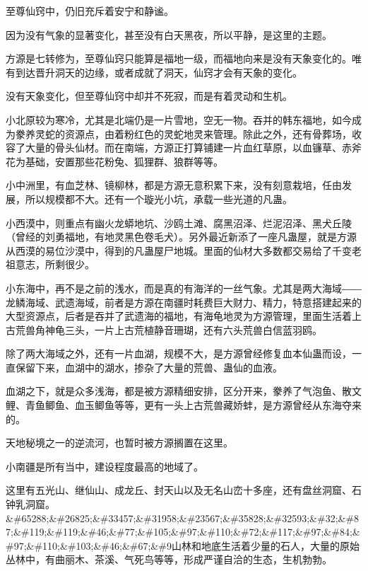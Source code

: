 
\begin{this_body}

至尊仙窍中，仍旧充斥着安宁和静谧。

因为没有气象的显著变化，甚至没有白天黑夜，所以平静，是这里的主题。

方源是七转修为，至尊仙窍只能算是福地一级，而福地向来是没有天象变化的。唯有到达晋升洞天的边缘，或者成就了洞天，仙窍才会有天象的变化。

没有天象变化，但至尊仙窍中却并不死寂，而是有着灵动和生机。

小北原较为寒冷，尤其是北端仍是一片雪地，空无一物。吞并的韩东福地，如今成为豢养灵蛇的资源点，由着粉红色的灵蛇地灵来管理。除此之外，还有骨葬场，收容了大量的骨头仙材。而在南端，方源正打算铺建一片血红草原，以血镰草、赤斧花为基础，安置那些花粉兔、狐狸群、狼群等等。

小中洲里，有血芝林、镜柳林，都是方源无意积累下来，没有刻意栽培，任由发展，所以规模都不大。还有一个璇光小坑，承载一些光道的凡蛊。

小西漠中，则重点有幽火龙蟒地坑、沙鸥土滩、腐黑沼泽、烂泥沼泽、黑犬丘陵（曾经的刘勇福地，有地灵黑色卷毛犬）。另外最近新添了一座凡蛊屋，就是方源从西漠的易位沙漠中，得到的凡蛊屋尸地城。里面的仙材大多数都交易给了千变老祖意志，所剩很少。

小东海中，再不是之前的浅水，而是真的有海洋的一丝气象。尤其是两大海域――龙鳞海域、武遗海域，前者是方源在南疆时耗费巨大财力、精力，特意搭建起来的大型资源点，后者是吞并了武遗海的福地，有海龟地灵为方源管理，里面生活着上古荒兽角神龟三头，一片上古荒植静音珊瑚，还有六头荒兽白信蓝羽鸥。

除了两大海域之外，还有一片血湖，规模不大，是方源曾经修复血本仙蛊而设，一直保留下来，血湖中的湖水，掺杂了大量的荒兽、蛊仙的血液。

血湖之下，就是众多浅海，都是被方源精细安排，区分开来，豢养了气泡鱼、散文鲤、青鱼鲫鱼、血玉鲫鱼等等，更有一头上古荒兽藏娇蚌，是方源曾经从东海夺来的。

天地秘境之一的逆流河，也暂时被方源搁置在这里。

小南疆是所有当中，建设程度最高的地域了。

这里有五光山、继仙山、成龙丘、封天山以及无名山峦十多座，还有盘丝洞窟、石钟乳洞窟。\&\#65288;\&\#26825;\&\#33457;\&\#31958;\&\#23567;\&\#35828;\&\#32593;\&\#32;\&\#87;\&\#119;\&\#119;\&\#46;\&\#77;\&\#105;\&\#97;\&\#110;\&\#72;\&\#117;\&\#97;\&\#84;\&\#97;\&\#110;\&\#103;\&\#46;\&\#67;\&\#9山林和地底生活着少量的石人，大量的原始丛林中，有曲丽木、茶溪、气死鸟等等，形成严谨自洽的生态，生机勃勃。


\end{this_body}
